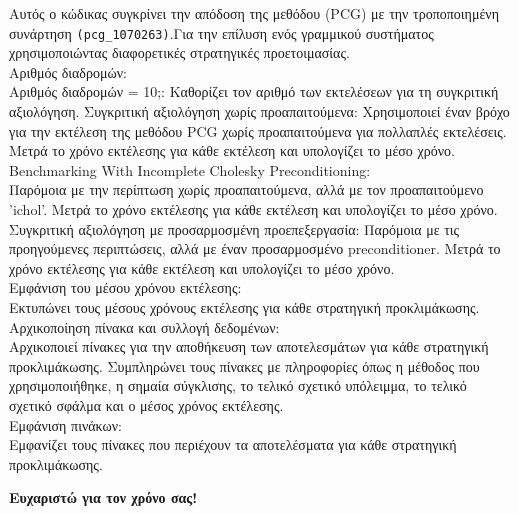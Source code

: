 \documentclass[12pt,a4paper]{article}
\begin{document}
Αυτός ο κώδικας συγκρίνει την απόδοση της μεθόδου (PCG) με την τροποποιημένη συνάρτηση \texttt{(pcg\_1070263)}.Για την επίλυση ενός γραμμικού συστήματος χρησιμοποιώντας διαφορετικές στρατηγικές προετοιμασίας.\\

Αριθμός διαδρομών:\\
Αριθμός διαδρομών = 10;: Καθορίζει τον αριθμό των εκτελέσεων για τη συγκριτική αξιολόγηση.
Συγκριτική αξιολόγηση χωρίς προαπαιτούμενα:
Χρησιμοποιεί έναν βρόχο για την εκτέλεση της μεθόδου PCG χωρίς προαπαιτούμενα για πολλαπλές εκτελέσεις.
Μετρά το χρόνο εκτέλεσης για κάθε εκτέλεση και υπολογίζει το μέσο χρόνο.\\

Benchmarking With Incomplete Cholesky Preconditioning:\\
Παρόμοια με την περίπτωση χωρίς προαπαιτούμενα, αλλά με τον προαπαιτούμενο 'ichol'.
Μετρά το χρόνο εκτέλεσης για κάθε εκτέλεση και υπολογίζει το μέσο χρόνο.
Συγκριτική αξιολόγηση με προσαρμοσμένη προεπεξεργασία:
Παρόμοια με τις προηγούμενες περιπτώσεις, αλλά με έναν προσαρμοσμένο preconditioner.
Μετρά το χρόνο εκτέλεσης για κάθε εκτέλεση και υπολογίζει το μέσο χρόνο.\\

Εμφάνιση του μέσου χρόνου εκτέλεσης:\\
Εκτυπώνει τους μέσους χρόνους εκτέλεσης για κάθε στρατηγική προκλιμάκωσης.\\

Αρχικοποίηση πίνακα και συλλογή δεδομένων:\\
Αρχικοποιεί πίνακες για την αποθήκευση των αποτελεσμάτων για κάθε στρατηγική προκλιμάκωσης.
Συμπληρώνει τους πίνακες με πληροφορίες όπως η μέθοδος που χρησιμοποιήθηκε, η σημαία σύγκλισης, το τελικό σχετικό υπόλειμμα, το τελικό σχετικό σφάλμα και ο μέσος χρόνος εκτέλεσης.\\

Εμφάνιση πινάκων:\\
Εμφανίζει τους πίνακες που περιέχουν τα αποτελέσματα για κάθε στρατηγική προκλιμάκωσης.\\

\begin{center}
\textbf{Ευχαριστώ για τον χρόνο σας!}
\end{center}

\end{document}

